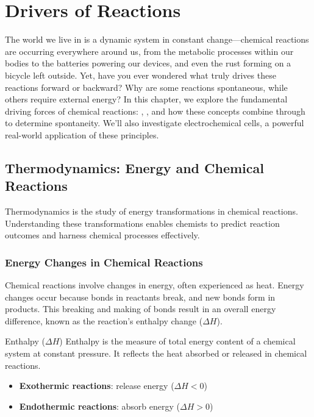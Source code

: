 \chapter{Drivers of Reactions}

The world we live in is a dynamic system in constant change—chemical reactions are occurring everywhere around us, from the metabolic processes within our bodies to the batteries powering our devices, and even the rust forming on a bicycle left outside. Yet, have you ever wondered what truly drives these reactions forward or backward? Why are some reactions spontaneous, while others require external energy? In this chapter, we explore the fundamental driving forces of chemical reactions: , , and how these concepts combine through  to determine spontaneity. We'll also investigate electrochemical cells, a powerful real-world application of these principles.

\section{Thermodynamics: Energy and Chemical Reactions}
\FloatBarrier
\FloatBarrier
\FloatBarrier

Thermodynamics is the study of energy transformations in chemical reactions. Understanding these transformations enables chemists to predict reaction outcomes and harness chemical processes effectively.

\subsection{Energy Changes in Chemical Reactions}
\FloatBarrier
\FloatBarrier
\FloatBarrier

Chemical reactions involve changes in energy, often experienced as heat. Energy changes occur because bonds in reactants break, and new bonds form in products. This breaking and making of bonds result in an overall energy difference, known as the reaction's enthalpy change (\(\Delta H\)).


\begin{keyconcept}{Enthalpy (\(\Delta H\))}
Enthalpy is the measure of total energy content of a chemical system at constant pressure. It reflects the heat absorbed or released in chemical reactions.
\begin{itemize}
    \item \textbf{Exothermic reactions}: release energy (\(\Delta H < 0\))
    \item \textbf{Endothermic reactions}: absorb energy (\(\Delta H > 0\))
\end{itemize}
\end{keyconcept}

